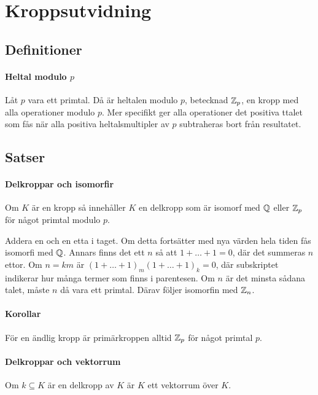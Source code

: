 \section{Kroppsutvidning}

\subsection{Definitioner}

\paragraph{Heltal modulo $p$}
Låt $p$ vara ett primtal. Då är heltalen modulo $p$, betecknad $\mathbb{Z}_{p}$, en kropp med alla operationer modulo $p$. Mer specifikt ger alla operationer det positiva ttalet som fås när alla positiva heltalsmultipler av $p$ subtraheras bort från resultatet.

\subsection{Satser}

\paragraph{Delkroppar och isomorfir}
Om $K$ är en kropp så innehåller $K$ en delkropp som är isomorf med $\mathbb{Q}$ eller $\mathbb{Z}_{p}$ för något primtal modulo $p$.

\proof
Addera en och en etta i taget. Om detta fortsätter med nya värden hela tiden fås isomorfi med $\mathbb{Q}$. Annars finns det ett $n$ så att $1 + \dots + 1 = 0$, där det summeras $n$ ettor. Om $n = km$ är $(1 + \dots + 1)_{m}(1 + \dots + 1)_{k} = 0$, där subskriptet indikerar hur många termer som finns i parentesen. Om $n$ är det minsta sådana talet, måste $n$ då vara ett primtal. Därav följer isomorfin med $\mathbb{Z}_{n}$.

\paragraph{Korollar}
För en ändlig kropp är primärkroppen alltid $\mathbb{Z}_{p}$ för något primtal $p$.

\proof

\paragraph{Delkroppar och vektorrum}
Om $k\subseteq K$ är en delkropp av $K$ är $K$ ett vektorrum över $K$.

